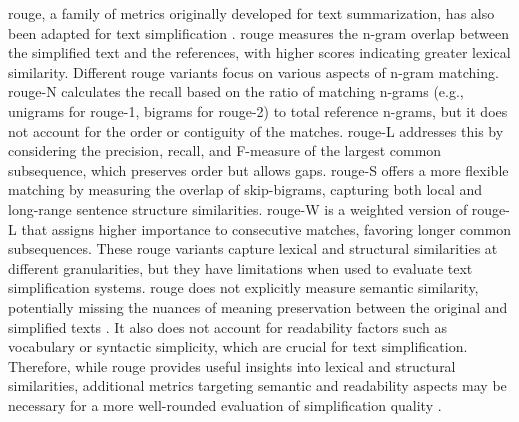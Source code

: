 \gls{rouge}, a family of metrics originally developed for text summarization, has also been adapted for text simplification \cite{xu-etal-2016-optimizing}.
\gls{rouge} measures the n-gram overlap between the simplified text and the references, with higher scores indicating greater lexical similarity.
Different \gls{rouge} variants focus on various aspects of n-gram matching.
\gls{rouge}-N calculates the recall based on the ratio of matching n-grams (e.g., unigrams for \gls{rouge}-1, bigrams for \gls{rouge}-2) to total reference n-grams, but it does not account for the order or contiguity of the matches. 
\gls{rouge}-L addresses this by considering the precision, recall, and F-measure of the largest common subsequence, which preserves order but allows gaps. 
\gls{rouge}-S offers a more flexible matching by measuring the overlap of skip-bigrams, capturing both local and long-range sentence structure similarities. 
\gls{rouge}-W is a weighted version of \gls{rouge}-L that assigns higher importance to consecutive matches, favoring longer common subsequences.
These \gls{rouge} variants capture lexical and structural similarities at different granularities, but they have limitations when used to evaluate text simplification systems. 
\gls{rouge} does not explicitly measure semantic similarity, potentially missing the nuances of meaning preservation between the original and simplified texts \cite{xu2024reasoningcomparisonllmenhancedsemantic}.
It also does not account for readability factors such as vocabulary or syntactic simplicity, which are crucial for text simplification.
Therefore, while \gls{rouge} provides useful insights into lexical and structural similarities, additional metrics targeting semantic and readability aspects may be necessary for a more well-rounded evaluation of simplification quality \cite{li2024largelanguagemodelsbiomedical}.

